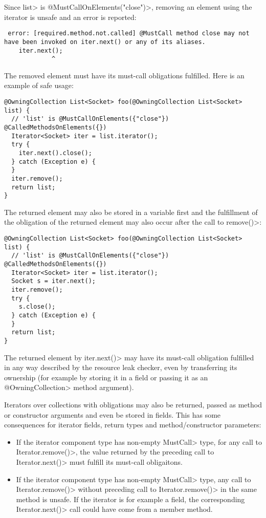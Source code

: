 Since \<list> is \<@MustCallOnElements("close")>, removing an element using the iterator is unsafe and an error is reported:
\begin{verbatim}
 error: [required.method.not.called] @MustCall method close may not have been invoked on iter.next() or any of its aliases.
    iter.next();
             ^
\end{verbatim}

The removed element must have its must-call obligations fulfilled. Here is an example of safe usage:

\begin{verbatim}
@OwningCollection List<Socket> foo(@OwningCollection List<Socket> list) {
  // 'list' is @MustCallOnElements({"close"}) @CalledMethodsOnElements({})
  Iterator<Socket> iter = list.iterator();
  try {
    iter.next().close();
  } catch (Exception e) {
  }
  iter.remove();
  return list;
}
\end{verbatim}

The returned element may also be stored in a variable first and the fulfillment of the obligation of the returned element may also occur after the call to \<remove()>:

\begin{verbatim}
@OwningCollection List<Socket> foo(@OwningCollection List<Socket> list) {
  // 'list' is @MustCallOnElements({"close"}) @CalledMethodsOnElements({})
  Iterator<Socket> iter = list.iterator();
  Socket s = iter.next();
  iter.remove();
  try {
    s.close();
  } catch (Exception e) {
  }
  return list;
}
\end{verbatim}

The returned element by \<iter.next()> may have its must-call obligation fulfilled in any way described by the resource leak checker, even by transferring its ownership (for example by storing it in a field or passing it as an \<@OwningCollection> method argument).

Iterators over collections with obligations may also be returned, passed as method or constructor arguments and even be stored in fields. This has some consequences for iterator fields, return types and method/constructor parameters:
\begin{itemize}
  \item If the iterator component type has non-empty \<MustCall> type, for any call to \<Iterator.remove()>, the value returned by the preceding call to \<Iterator.next()> must fulfill its must-call obligaitons.
  \item If the iterator component type has non-empty \<MustCall> type, any call to \<Iterator.remove()> without preceding call to \<Iterator.remove()> in the same method is unsafe. If the iterator is for example a field, the corresponding \<Iterator.next()> call could have come from a member method.
\end{itemize}

